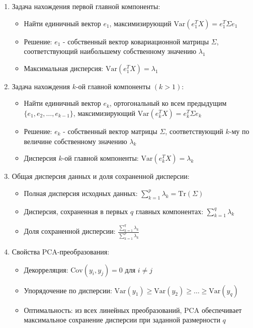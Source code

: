 \documentclass[a4paper,12pt]{article}
\begin{document}
\begin{enumerate}
    \item Задача нахождения первой главной компоненты:
    \begin{itemize}
        \item Найти единичный вектор $e_1$, максимизирующий $\text{Var}(e_1^T X) = e_1^T \Sigma e_1$
        \item Решение: $e_1$ - собственный вектор ковариационной матрицы $\Sigma$, соответствующий наибольшему собственному значению $\lambda_1$
        \item Максимальная дисперсия: $\text{Var}(e_1^T X) = \lambda_1$
    \end{itemize}

    \item Задача нахождения $k$-ой главной компоненты $(k > 1)$:
    \begin{itemize}
        \item Найти единичный вектор $e_k$, ортогональный ко всем предыдущим $\{e_1, e_2, \ldots, e_{k-1}\}$, максимизирующий $\text{Var}(e_k^T X) = e_k^T \Sigma e_k$
        \item Решение: $e_k$ - собственный вектор матрицы $\Sigma$, соответствующий $k$-му по величине собственному значению $\lambda_k$
        \item Дисперсия $k$-ой главной компоненты: $\text{Var}(e_k^T X) = \lambda_k$
    \end{itemize}

    \item Общая дисперсия данных и доля сохраненной дисперсии:
    \begin{itemize}
        \item Полная дисперсия исходных данных: $\sum_{k=1}^p \lambda_k = \text{Tr}(\Sigma)$
        \item Дисперсия, сохраненная в первых $q$ главных компонентах: $\sum_{k=1}^q \lambda_k$
        \item Доля сохраненной дисперсии: $\frac{\sum_{k=1}^q \lambda_k}{\sum_{k=1}^p \lambda_k}$
    \end{itemize}

    \item Свойства PCA-преобразования:
    \begin{itemize}
        \item Декорреляция: $\text{Cov}(y_i, y_j) = 0$ для $i \neq j$
        \item Упорядочение по дисперсии: $\text{Var}(y_1) \geq \text{Var}(y_2) \geq \ldots \geq \text{Var}(y_q)$
        \item Оптимальность: из всех линейных преобразований, PCA обеспечивает максимальное сохранение дисперсии при заданной размерности $q$
    \end{itemize}
\end{enumerate}
\end{document}
